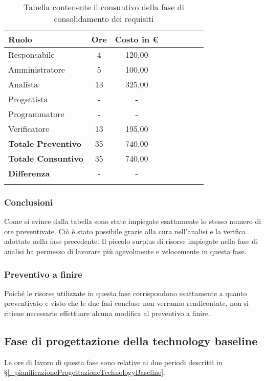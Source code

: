 \begin{longtable}{|l|c|c|c|c|c|c|c|}
	\hline
	\rowcolor{lighter-grayer}
	\textbf{Ruolo}             & \textbf{Ore} & \textbf{Costo in €} \\
	\hline
	\endfirsthead

	\hline
	Responsabile               & 4           & 120,00              \\
	\hline
	\hline
	Amministratore             & 5       & 100,00      \\
	\hline
	\hline
	Analista                   & 13       & 325,00   \\
	\hline
	\hline
	Progettista                & -            & -                   \\
	\hline
	\hline
	Programmatore              & -            & -                   \\
	\hline
	\hline
	Verificatore               & 13       & 195,00    \\
	\hline
	\textbf{Totale Preventivo} & 35          & 740,00            \\
	\hline
	\hline
	\textbf{Totale Consuntivo} & 35          & 740,00            \\
	\hline
	\hline
	\textbf{Differenza}        & -           & -            \\
	\hline
	\rowcolor{white}
	\caption{Tabella contenente il consuntivo della fase di consolidamento dei requisiti}
\end{longtable}
\subsubsection{Conclusioni}
Come si evince dalla tabella sono state impiegate esattamente lo stesso numero di ore preventivate. Ciò è stato possibile grazie alla cura nell'analisi e la verifica adottate nella fase precedente. Il piccolo surplus di risorse impiegate nella fase di analisi ha permesso di lavorare più agevolmente e velocemente in questa fase.

\subsubsection{Preventivo a finire}
Poiché le risorse utilizzate in questa fase corrispondono esattamente a quanto preventivato e visto che le due fasi concluse non verranno rendicontate, non si ritiene necessario effettuare alcuna modifica al preventivo a finire.


\subsection{Fase di progettazione della technology baseline} \label{_consuntivoTB}
Le ore di lavoro di questa fase sono relative ai due periodi descritti in \S\ref{_pianificazioneProgettazioneTechnologyBaseline}.

